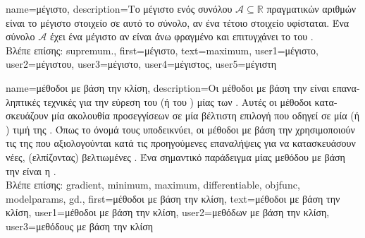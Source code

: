 {name={\foreignlanguage{greek}{μέγιστο}},
     description={\foreignlanguage{greek}{Το μέγιστο ενός συνόλου} 
		$\mathcal{A} \subseteq \mathbb{R}$ \foreignlanguage{greek}{πραγματικών αριθμών είναι το μέγιστο στοιχείο σε αυτό το σύνολο, 
		αν ένα τέτοιο στοιχείο υφίσταται. Ένα σύνολο $\mathcal{A}$ έχει ένα μέγιστο αν είναι άνω φραγμένο και 
		επιτυγχάνει το}  \foreignlanguage{greek}{του} \cite[Sec.~1.4]{RudinBookPrinciplesMatheAnalysis}.\\
		\foreignlanguage{greek}{Βλέπε επίσης:} \gls{supremum}.},
 	first={\foreignlanguage{greek}{μέγιστο}},
 	text={maximum},
 	user1={\foreignlanguage{greek}{μέγιστο}}, %
 	user2={\foreignlanguage{greek}{μέγιστου}}, %
 	user3={\foreignlanguage{greek}{μέγιστο}}, %
 	user4={\foreignlanguage{greek}{μέγιστος}}, %
 	user5={\foreignlanguage{greek}{μέγιστη}} %
}

{name={\foreignlanguage{greek}{μέθοδοι με βάση την κλίση}}, 
	description={\foreignlanguage{greek}{Οι μέθοδοι με βάση την}  
		\foreignlanguage{greek}{είναι επαναληπτικές τεχνικές για την εύρεση του}  (\foreignlanguage{greek}{ή του} ) 
		\foreignlanguage{greek}{μίας}   \foreignlanguage{greek}{των} . 
		\foreignlanguage{greek}{Αυτές οι μέθοδοι κατασκευάζουν μία ακολουθία προσεγγίσεων σε μία βέλτιστη επιλογή} 
		 \foreignlanguage{greek}{που οδηγεί σε μία}  (\foreignlanguage{greek}{ή} ) 
		\foreignlanguage{greek}{τιμή της} . \foreignlanguage{greek}{Όπως το όνομά τους υποδεικνύει,}
		\foreignlanguage{greek}{οι μέθοδοι με βάση την}  \foreignlanguage{greek}{χρησιμοποιούν τις}  
		\foreignlanguage{greek}{της}  \foreignlanguage{greek}{που αξιολογούνται κατά τις προηγούμενες επαναλήψεις για να
		κατασκευάσουν νέες, (ελπίζοντας) βελτιωμένες} . \foreignlanguage{greek}{Ένα σημαντικό παράδειγμα μίας 
		μεθόδου με βάση την}  \foreignlanguage{greek}{είναι η} .\\
		\foreignlanguage{greek}{Βλέπε επίσης:} \gls{gradient}, \gls{minimum}, \gls{maximum}, \gls{differentiable}, \gls{objfunc}, \glspl{modelparam}, \gls{gd}.},
	first={\foreignlanguage{greek}{μέθοδοι με βάση την κλίση}},
	text={\foreignlanguage{greek}{μέθοδοι με βάση την κλίση}},
	user1={\foreignlanguage{greek}{μέθοδοι με βάση την κλίση}}, %
	user2={\foreignlanguage{greek}{μεθόδων με βάση την κλίση}}, %
	user3={\foreignlanguage{greek}{μεθόδους με βάση την κλίση}} %
}

